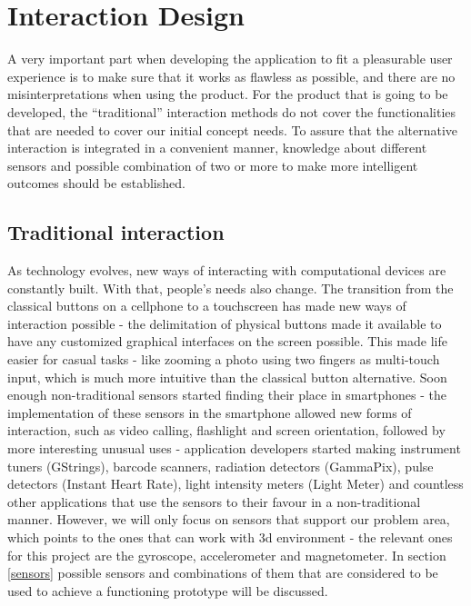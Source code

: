 \section{Interaction Design}
A very important part when developing the application to fit a pleasurable user experience is to make sure that it works as flawless as possible, and there are no misinterpretations when using the product. For the product that is going to be developed, the “traditional” interaction methods do not cover the functionalities that are needed to cover our initial concept needs. To assure that the alternative interaction is integrated in a convenient manner, knowledge about different sensors and possible combination of two or more to make more intelligent outcomes should be established.
\subsection{Traditional interaction}
As technology evolves, new ways of interacting with computational devices are constantly built. With that, people’s needs also change. The transition from the classical buttons on a cellphone to a touchscreen has made new ways of interaction possible - the delimitation of physical buttons made it available to have any customized graphical interfaces on the screen possible. This made life easier for casual tasks - like zooming a photo using two fingers as multi-touch input, which is much more intuitive than the classical button alternative.
Soon enough non-traditional sensors started finding their place in smartphones - the implementation of these sensors in the smartphone allowed new forms of interaction, such as video calling, flashlight and screen orientation, followed by more interesting unusual uses - application developers started making instrument tuners (GStrings), barcode scanners, radiation detectors (GammaPix), pulse detectors (Instant Heart Rate), light intensity meters (Light Meter) and countless other applications that use the sensors to their favour in a non-traditional manner. However, we will only focus on sensors that support our problem area, which points to the ones that can work with 3d environment - the relevant ones for this project are the gyroscope, accelerometer and magnetometer. In section \ref{sensors} possible sensors and combinations of them that are considered to be used to achieve a functioning prototype will be discussed. %

